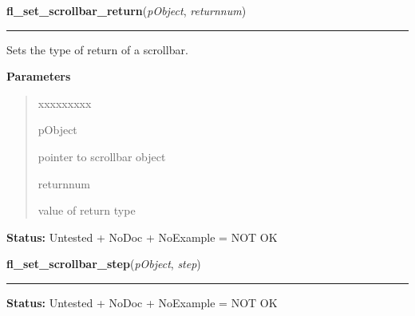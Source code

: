 \hspace{.8\funcindent}\begin{boxedminipage}{\funcwidth}

    \raggedright \textbf{fl\_set\_scrollbar\_return}(\textit{pObject}, \textit{returnnum})

    \vspace{-1.5ex}

    \rule{\textwidth}{0.5\fboxrule}
\setlength{\parskip}{2ex}
    Sets the type of return of a scrollbar.

\setlength{\parskip}{1ex}
      \textbf{Parameters}
      \vspace{-1ex}

      \begin{quote}
        \begin{Ventry}{xxxxxxxxx}

          \item[pObject]

          pointer to scrollbar object

          \item[returnnum]

          value of return type

        \end{Ventry}

      \end{quote}

\textbf{Status:} Untested + NoDoc + NoExample = NOT OK



    \end{boxedminipage}

    \label{xformslib:library:fl_set_scrollbar_step}

    \vspace{0.5ex}

\hspace{.8\funcindent}\begin{boxedminipage}{\funcwidth}

    \raggedright \textbf{fl\_set\_scrollbar\_step}(\textit{pObject}, \textit{step})

    \vspace{-1.5ex}

    \rule{\textwidth}{0.5\fboxrule}
\setlength{\parskip}{2ex}
\setlength{\parskip}{1ex}
\textbf{Status:} Untested + NoDoc + NoExample = NOT OK



    \end{boxedminipage}

